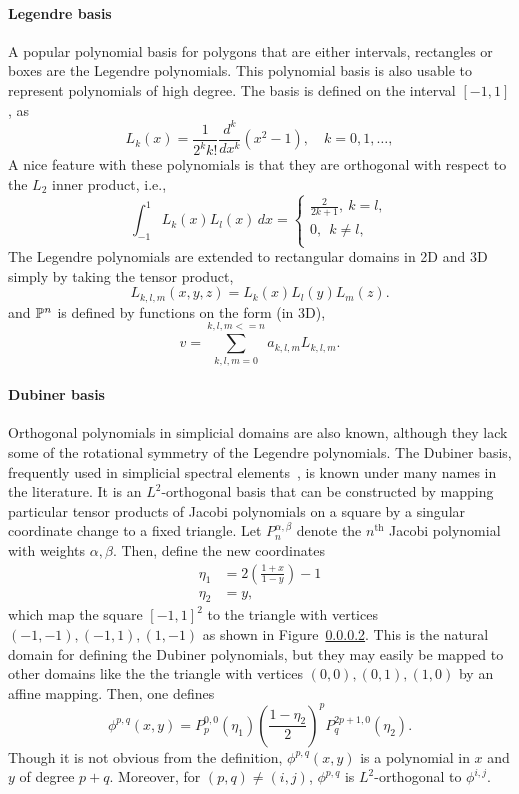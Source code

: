 \paragraph{Legendre basis}

A popular polynomial basis for polygons that are either intervals, rectangles or boxes are the Legendre polynomials.
This polynomial basis is also usable to represent polynomials of high degree.
The basis is defined on the interval $[-1,1]$, as
\[
L_k(x) = \frac{1}{2^k k!} \frac{d^k}{dx^k} (x^2 -1), \quad k=0,1,\ldots,
\]
A nice feature with these polynomials is that they are orthogonal
with respect to the $L_2$ inner product, i.e.,
\[
\int_{-1}^1 L_k (x) L_l(x) \, dx  =
\left\{
\begin{array}{c}
\frac{2}{2k+1}, \ k=l, \\
0 , \ \ k\not= l, \\
\end{array}
\right.
\]
The Legendre polynomials are extended to rectangular domains in 2D and
3D simply by taking the tensor product,
\[
L_{k,l,m}(x,y,z) = L_k(x) L_l(y) L_m(z) .
\]
and $\P^n$ is defined by functions on the form (in 3D),
\[
v = \sum_{k,l,m=0}^{k,l,m <= n}   a_{k,l,m} L_{k,l,m} .
\]

\paragraph{Dubiner basis}

Orthogonal polynomials in simplicial domains are also known, although
they lack some of the rotational symmetry of the Legendre polynomials.
The Dubiner basis, frequently used in simplicial spectral
elements~\cite{missing}, is known under many names in the literature.  It is
an \( L^2 \)-orthogonal basis that can be constructed by mapping particular
tensor products of Jacobi polynomials on a square by a singular
coordinate change to a fixed triangle.
Let \( P^{\alpha,\beta}_n \) denote the \( n^\mathrm{th} \) Jacobi
polynomial with weights \( \alpha, \beta \).  Then, define the
new coordinates
\begin{equation}
\label{eq:dubcoord}
\begin{split}
\eta_1 & = 2\left(\frac{1+x}{1-y}\right)-1 \\
\eta_2 & = y,
\end{split}
\end{equation}
which map the square \( [-1,1]^2 \) to the triangle with
vertices \( (-1,-1),(-1,1),(1,-1) \) as shown in Figure~\ref{}.  This
is the natural domain for defining the Dubiner polynomials, but they
may easily be mapped to other domains like the the triangle with
vertices
\( (0,0) , (0,1) , (1,0) \) by an affine mapping.
Then, one defines
\begin{equation}
\phi^{p,q}(x,y) = P_p^{0,0}(\eta_1) \left( \frac{1-\eta_2}{2}
\right)^p P_q^{2p+1,0}(\eta_2).
\end{equation}
Though it is not obvious from the definition, \( \phi^{p,q}(x,y) \) is
a polynomial in \( x \) and \( y \) of degree \( p + q \).  Moreover,
for \( (p,q) \neq (i,j) \), \( \phi^{p,q} \) is \( L^2 \)-orthogonal to \(
\phi^{i,j} \).

